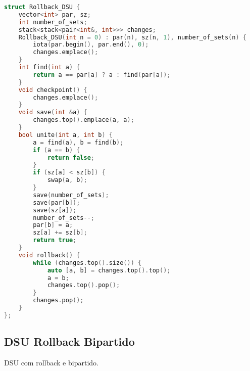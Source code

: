 \documentclass[11pt, a4paper, oneside]{book}
\begin{document}
\begin{multicols}{2}
\begin{lstlisting}[language=C++]
struct Rollback_DSU {
    vector<int> par, sz;
    int number_of_sets;
    stack<stack<pair<int&, int>>> changes;
    Rollback_DSU(int n = 0) : par(n), sz(n, 1), number_of_sets(n) {
        iota(par.begin(), par.end(), 0);
        changes.emplace();
    }
    int find(int a) {
        return a == par[a] ? a : find(par[a]);
    }
    void checkpoint() {
        changes.emplace();
    }
    void save(int &a) {
        changes.top().emplace(a, a);
    }
    bool unite(int a, int b) {
        a = find(a), b = find(b);
        if (a == b) {
            return false;
        }
        if (sz[a] < sz[b]) {
            swap(a, b);
        }
        save(number_of_sets);
        save(par[b]);
        save(sz[a]);
        number_of_sets--;
        par[b] = a;
        sz[a] += sz[b];
        return true;
    }
    void rollback() {
        while (changes.top().size()) {
            auto [a, b] = changes.top().top();
            a = b;
            changes.top().pop();
        }
        changes.pop();
    }
};\end{lstlisting}
\end{multicols}

\hfill

\subsection{DSU Rollback Bipartido}


DSU com rollback e bipartido.

\hfill
\end{document}
